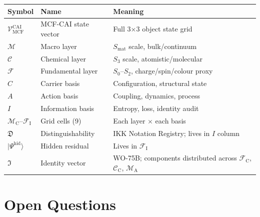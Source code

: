 \documentclass[11pt, a4paper, oneside]{article}
\theoremstyle{definition}
\theoremstyle{plain}
\theoremstyle{remark}
\newcommand{\Macro}{\mathscr{M}}          %
\newcommand{\Chem}{\mathscr{C}}           %
\newcommand{\Fund}{\mathscr{F}}           %
\newcommand{\MC}{\Macro_{\mathrm{C}}}
\newcommand{\MA}{\Macro_{\mathrm{A}}}
\newcommand{\CC}{\Chem_{\mathrm{C}}}
\newcommand{\FC}{\Fund_{\mathrm{C}}}
\newcommand{\FI}{\Fund_{\mathrm{I}}}
\newcommand{\Vobj}{\mathcal{V}_{\mathrm{MCF}}^{\mathrm{CAI}}}
\newcommand{\Dfrak}{\mathfrak{D}}
\newcommand{\Ifrak}{\mathfrak{I}}
\newcommand{\Psihid}{|\Psi^{\mathrm{hid}}\rangle}
\begin{document}
\begin{longtable}{p{3cm} p{4cm} p{6cm}}
  \toprule
  \textbf{Symbol} & \textbf{Name} & \textbf{Meaning} \\
  \midrule
  $\Vobj$   & MCF-CAI state vector  & Full 3$\times$3 object state grid \\
  $\Macro$  & Macro layer           & $S_{\mathrm{mat}}$ scale, bulk/continuum \\
  $\Chem$   & Chemical layer        & $S_3$ scale, atomistic/molecular \\
  $\Fund$   & Fundamental layer     & $S_0$--$S_2$, charge/spin/colour proxy \\
  $C$       & Carrier basis         & Configuration, structural state \\
  $A$       & Action basis          & Coupling, dynamics, process \\
  $I$       & Information basis     & Entropy, loss, identity audit \\
  $\MC$--$\FI$ & Grid cells (9)     & Each layer $\times$ each basis \\
  $\Dfrak$  & Distinguishability    & IKK Notation Registry; lives in $I$ column \\
  $\Psihid$ & Hidden residual       & Lives in $\FI$ \\
  $\Ifrak$  & Identity vector       & WO-75B; components distributed across $\FC$, $\CC$, $\MA$ \\
  \bottomrule
\end{longtable}

\section{Open Questions}
\end{document}

